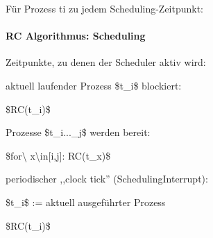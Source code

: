 \documentclass[a4paper]{article}
\begin{document}
\begin{multicols}{3}
    Für Prozess ti zu jedem Scheduling-Zeitpunkt:



    \paragraph{RC Algorithmus: Scheduling}

    Zeitpunkte, zu denen der Scheduler aktiv wird:

    \begin{enumerate*}
        \item
        aktuell laufender Prozess \$t\_i\$ blockiert:
        \begin{itemize*}
            \item \$RC(t\_i)\$
        \end{itemize*}
        \item
        Prozesse \$t\_i...\_j\$ werden bereit:
        \begin{itemize*}
            \item \$for\textbackslash{} x\textbackslash in{[}i,j{]}: RC(t\_x)\$
        \end{itemize*}
        \item
        periodischer ,,clock tick'' (SchedulingInterrupt):
        \begin{itemize*}
            \item \$t\_i\$ := aktuell ausgeführter Prozess
            \item \$RC(t\_i)\$
        \end{itemize*}
    \end{enumerate*}


\end{multicols}
\end{document}
